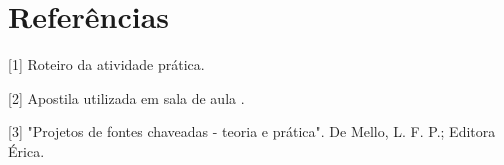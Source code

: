 \newpage
\section{Referências}

[1] Roteiro da atividade prática.
\vspace{0.5cm}

[2] Apostila utilizada em sala de aula	.
\vspace{0.5cm}

[3] "Projetos de fontes chaveadas - teoria e prática". De Mello, L. F. P.; Editora Érica.
